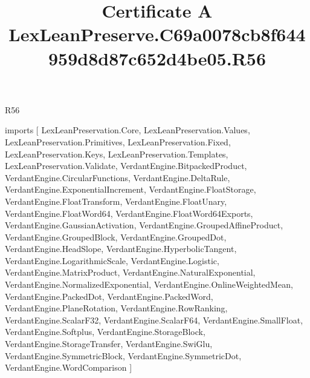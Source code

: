 \begin{lexlean}{R56}
\title{Certificate A LexLeanPreserve.C69a0078cb8f644959d8d87c652d4be05.R56}
\begin{coremodule}
imports [
  LexLeanPreservation.Core,
  LexLeanPreservation.Values,
  LexLeanPreservation.Primitives,
  LexLeanPreservation.Fixed,
  LexLeanPreservation.Keys,
  LexLeanPreservation.Templates,
  LexLeanPreservation.Validate,
  VerdantEngine.BitpackedProduct,
  VerdantEngine.CircularFunctions,
  VerdantEngine.DeltaRule,
  VerdantEngine.ExponentialIncrement,
  VerdantEngine.FloatStorage,
  VerdantEngine.FloatTransform,
  VerdantEngine.FloatUnary,
  VerdantEngine.FloatWord64,
  VerdantEngine.FloatWord64Exports,
  VerdantEngine.GaussianActivation,
  VerdantEngine.GroupedAffineProduct,
  VerdantEngine.GroupedBlock,
  VerdantEngine.GroupedDot,
  VerdantEngine.HeadSlope,
  VerdantEngine.HyperbolicTangent,
  VerdantEngine.LogarithmicScale,
  VerdantEngine.Logistic,
  VerdantEngine.MatrixProduct,
  VerdantEngine.NaturalExponential,
  VerdantEngine.NormalizedExponential,
  VerdantEngine.OnlineWeightedMean,
  VerdantEngine.PackedDot,
  VerdantEngine.PackedWord,
  VerdantEngine.PlaneRotation,
  VerdantEngine.RowRanking,
  VerdantEngine.ScalarF32,
  VerdantEngine.ScalarF64,
  VerdantEngine.SmallFloat,
  VerdantEngine.Softplus,
  VerdantEngine.StorageBlock,
  VerdantEngine.StorageTransfer,
  VerdantEngine.SwiGlu,
  VerdantEngine.SymmetricBlock,
  VerdantEngine.SymmetricDot,
  VerdantEngine.WordComparison
]


\end{coremodule}
\end{lexlean}

